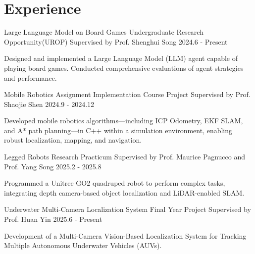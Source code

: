 \section{Experience}

\cventry
{Large Language Model on Board Games} %
{Undergraduate Research Opportunity(UROP)} %
{Supervised by Prof. Shenghui Song} %
{2024.6 - Present} %
\begin{cvitems}
\item {Designed and implemented a Large Language Model (LLM) agent capable of playing board games. Conducted comprehensive evaluations of agent strategies and performance.}
\end{cvitems}

\cventry
{Mobile Robotics Assignment Implementation} %
{Course Project} %
{Supervised by Prof. Shaojie Shen} %
{2024.9 - 2024.12} %
\begin{cvitems}
\item {Developed mobile robotics algorithms—including ICP Odometry, EKF SLAM, and A* path planning—in C++ within a simulation environment, enabling robust localization, mapping, and navigation.}
\end{cvitems}

\cventry
{Legged Robots} %
{Research Practicum} %
{Supervised by Prof. Maurice Pagnucco and Prof. Yang Song} %
{2025.2 - 2025.8} %
\begin{cvitems}
\item {Programmed a Unitree GO2 quadruped robot to perform complex tasks, integrating depth camera-based object localization and LiDAR-enabled SLAM.}
\end{cvitems}

\cventry
{Underwater Multi-Camera Localization System} %
{Final Year Project} %
{Supervised by Prof. Huan Yin} %
{2025.6 - Present} %
\begin{cvitems}
\item {Development of a Multi-Camera Vision-Based Localization System for Tracking Multiple Autonomous Underwater Vehicles (AUVs).}
\end{cvitems}